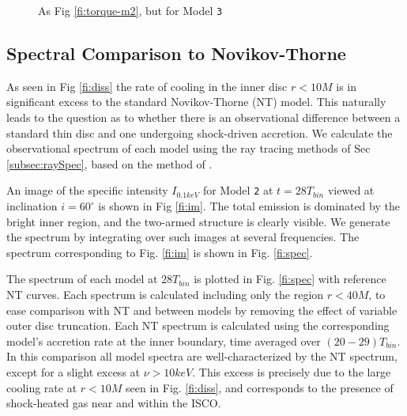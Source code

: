 \documentclass{emulateapj}
\newcommand{\model}[1]{{Model \texttt{#1}}}
\begin{document}
\begin{figure}
	\caption{\label{fi:torque-m4} As Fig \ref{fi:torque-m2}, but for \model{3}}  
\end{figure}

\subsection{Spectral Comparison to Novikov-Thorne}
\label{subsec:spectra}

As seen in Fig \ref{fi:diss} the rate of cooling in the inner disc $r < 10M$ is in significant excess to the standard Novikov-Thorne (NT) model.  This naturally leads to the question as to whether there is an observational difference between a standard thin disc and one undergoing shock-driven accretion.  We calculate the observational spectrum of each model using the ray tracing methods of Sec \ref{subsec:raySpec}, based on the method of \cite{Kulkarni11}.

\begin{figure*}
	\caption{\label{fi:im} Ray-traced image of \model{2} at $\nu =   1keV$.}
\end{figure*}

An image of the specific intensity $I_{0.1keV}$ for \model{2} at $t=28 T_{bin}$ viewed at inclination $i=60^\circ$ is shown in Fig \ref{fi:im}.  The total emission is dominated by the bright inner region, and the two-armed structure is clearly visible. We generate the spectrum by integrating over such images at several frequencies.  The spectrum corresponding to Fig. \ref{fi:im} is shown in Fig. \ref{fi:spec}. 

The spectrum of each model at $28 T_{bin}$ is plotted in Fig. \ref{fi:spec} with reference NT curves.  Each spectrum is calculated including only the region $r<40M$, to ease comparison with NT and between models by removing the effect of variable outer disc truncation.  Each NT spectrum is calculated using the corresponding model's accretion rate at the inner boundary, time averaged over $(20-29)T_{bin}$.  In this comparison all model spectra are well-characterized by the NT spectrum, except for a slight excess at $\nu > 10keV$.  This excess is precisely due to the large cooling rate at $r<10M$ seen in Fig. \ref{fi:diss}, and corresponds to the presence of shock-heated gas near and within the ISCO.  


\begin{figure*}
	\caption{\label{fi:spec} Spectra of \model{1} (blue circles), \model{2} (orange crosses), and \model{3} (green triangles) at $t = 28 T_{bin}$, obtained by integrating over the ray-traced intensity (e.g. in Fig \ref{fi:im}).  Solid lines are Novikov-Thorne spectra with $\dot{M}$ of the inner boundary averaged over $20 T_{bin}$ to $29 T_{bin}$ for each model.  Only the $R<40M$ region is included in the integration, to remove the effect of truncation at the outer disc edge.  The inclination angle $i=60^\circ$ and the distance $D=1kpc$.}
\end{figure*}
\end{document}
